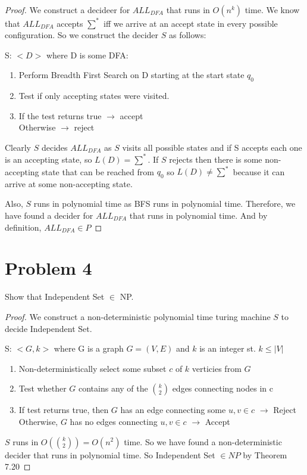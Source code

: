 \documentclass[11pt]{article}
\begin{document}
\begin{proof}


We construct a decideer for $ALL_{DFA}$ that runs in $O(n^k)$ time. We know that $ALL_{DFA}$ accepts $\sum^*$ iff we arrive at an accept state in every possible configuration. So we construct the decider $S$ as follows:

S: $<D>$ where D is some DFA:
\begin{enumerate}
\item Perform Breadth First Search on D starting at the start state $q_0$
\item Test if only accepting states were visited.
\item If the test returns true $\rightarrow$ accept\\
	Otherwise $\rightarrow$ reject
\end{enumerate}

Clearly $S$ decides $ALL_{DFA}$ as $S$ visits all possible states and if S accepts each one is an accepting state, so $L(D) = \sum^*$. If $S$ rejects then there is some non-accepting state that can be reached from $q_0$ so $L(D) \neq \sum^*$ because it can arrive at some non-accepting state.

Also, $S$ runs in polynomial time as BFS runs in polynomial time.
Therefore, we have found a decider for $ALL_{DFA}$ that runs in polynomial time. And by definition, $ALL_{DFA} \in P$ 

\end{proof}

\newpage
\section*{Problem 4}

Show that Independent Set $\in$ NP.


\begin{proof}

We construct a non-deterministic polynomial time turing machine $S$ to decide Independent Set. 

S: $<G, k>$ where G is a graph $G = (V,E)$ and $k$ is an integer st. $k \leq |V|$

\begin{enumerate}

\item Non-deterministically select some subset $c$ of $k$ verticies from $G$
\item Test whether $G$ contains any of the $k \choose 2$ edges connecting nodes in c
\item If test returns true, then $G$ has an edge connecting some $u,v \in c$ $\rightarrow$ Reject\\
	Otherwise, $G$ has no edges connecting $u, v \in c$ $\rightarrow$ Accept

\end{enumerate}

$S$ runs in $O({k \choose 2}) = O(n^2)$ time. So we have found a non-deterministic decider that runs in polynomial time. So Independent Set $\in NP$ by Theorem 7.20 

\end{proof}
\end{document}
